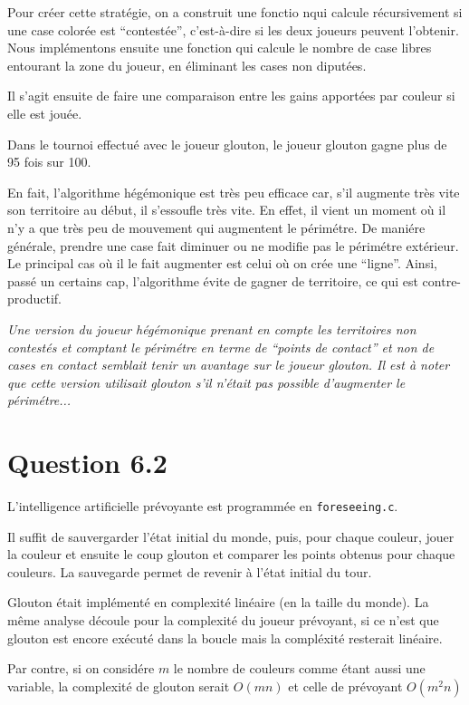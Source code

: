 \documentclass[a4paper,11pt]{article}
\newenvironment{remarque}%
{\description\item[Remarque.]\sl}%
{\enddescription}
\begin{document}
Pour créer cette stratégie, on a construit une fonctio nqui calcule récursivement si une case colorée est ``contestée'', c'est-à-dire si les deux joueurs peuvent l'obtenir. Nous implémentons ensuite une fonction qui calcule le nombre de case libres entourant la zone du joueur, en éliminant les cases non diputées.

Il s'agit ensuite de faire une comparaison entre les gains apportées par couleur si elle est jouée.

Dans le tournoi effectué avec le joueur glouton, le joueur glouton gagne plus de 95 fois sur 100.

En fait, l'algorithme hégémonique est très peu efficace car, s'il augmente très vite son territoire au début, il s'essoufle très vite. En effet, il vient un moment où il n'y a que très peu de mouvement qui augmentent le périmétre. De maniére générale, prendre une case fait diminuer ou ne modifie pas le périmétre extérieur. Le principal cas où il le fait augmenter est celui où on crée une ``ligne''. Ainsi, passé un certains cap, l'algorithme évite de gagner de territoire, ce qui est contre-productif.

\begin{remarque}
  Une version du joueur hégémonique prenant en compte les territoires non contestés et comptant le périmétre en terme de ``points de contact'' et non de cases en contact semblait tenir un avantage sur le joueur glouton. Il est à noter que cette version utilisait glouton s'il n'était pas possible d'augmenter le périmétre...
\end{remarque}

\section{Question 6.2}

L'intelligence artificielle prévoyante est programmée en \texttt{foreseeing.c}.

Il suffit de sauvergarder l'état initial du monde, puis, pour chaque couleur, jouer la couleur et ensuite le coup glouton et comparer les points obtenus pour chaque couleurs. La sauvegarde permet de revenir à l'état initial du tour.

Glouton était implémenté en complexité linéaire (en la taille du monde). La même analyse découle pour la complexité du joueur prévoyant, si ce n'est que glouton est encore exécuté dans la boucle mais la compléxité resterait linéaire.

Par contre, si on considére $m$ le nombre de couleurs comme étant aussi une variable, la complexité de glouton serait $O(mn)$ et celle de prévoyant $O(m^2n)$
\end{document}
